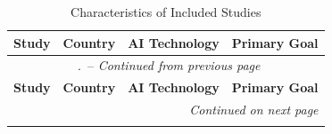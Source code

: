 \setcounter{table}{0}
\renewcommand{\thetable}{\thechapter.\arabic{table}}

\begin{longtable}{p{}p{}p{}p{}}
    \caption{Characteristics of Included Studies} \label{tab:included_studies}                                                                                                                                                                                                                                                                                                                                                          \\
    \toprule
    \textbf{Study}                                                                                                                     & \textbf{Country}  & \textbf{AI Technology}            & \textbf{Primary Goal}                                                                                                                                                                                                                  \\
    \midrule
    \endfirsthead

    \multicolumn{4}{c}{\tablename\ \thetable\ -- \textit{Continued from previous page}}                                                                                                                                                                                                                                                                                                                                                 \\
    \toprule
    \textbf{Study}                                                                                                                     & \textbf{Country}  & \textbf{AI Technology}            & \textbf{Primary Goal}                                                                                                                                                                                                                  \\
    \midrule
    \endhead

    \midrule
    \multicolumn{4}{r}{\textit{Continued on next page}}                                                                                                                                                                                                                                                                                                                                                                                 \\
    \endfoot


\end{longtable}
